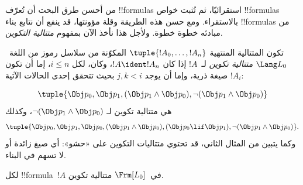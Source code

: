 \documentclass[../../../include/open-logic-section]{subfiles}
\begin{document}


من أحسن طرق البحث أن تُعرّف !!{formula}s استقرائيًا، ثم تُثبت خواص
!!{formula}s بالاستقراء. ومع حسن هذه الطريقة وقلة مؤونتها، قد ينفع أن نتابع بناء
!!{formula}s من مبادئه خطوة خطوة. ولأجل هذا نأخذ الآن بمفهوم
\emph{متتالية التكوين}.

\begin{defn}
تكون المتتالية المنتهية $\tuple{!A_0,\dotsc,!A_n}$ المكوّنة من سلاسل
رموز من اللغة~$\Lang L_0$ \emph{متتالية تكوين} لـ~$!A$ إذا كان
$!A \ident !A_n$، وكان، لكل $i \leq n$، إما أن تكون $!A_i$ صيغة ذرية،
وإما أن يوجد $j,k < i$ بحيث تتحقق إحدى الحالات الآتية:
\begin{enumerate}
\end{enumerate}
\end{defn}

\begin{ex}
\[
\tuple{
    \Obj p_0,
    \Obj p_1,
    (\Obj p_1 \land \Obj p_0),
    \lnot (\Obj p_1 \land \Obj p_0)
}
\]
هي متتالية تكوين لـ
$\lnot (\Obj p_1 \land \Obj p_0)$، وكذلك
\[
\tuple{
    \Obj p_0,
    \Obj p_1,
    \Obj p_0,
    (\Obj p_1 \land \Obj p_0),
    (\Obj p_0 \lif \Obj p_1),
    \lnot (\Obj p_1 \land \Obj p_0)
}.
\]
%
وكما يتبين من المثال الثاني، قد تحتوي متتاليات التكوين على «حشو»:
أي صيغ زائدة أو لا تسهم في البناء.
\end{ex}

\begin{prop}
لكل !!{formula}~$!A$ في~$\Frm[L_0]$ متتالية تكوين.
\end{prop}
\end{document}
